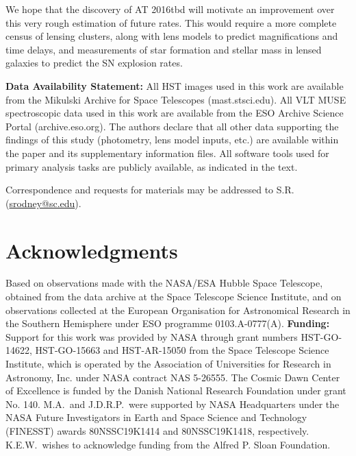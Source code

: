 \documentclass[12pt]{article}
\def\SNABC{AT 2016tbd\xspace}
\begin{document}
We hope that the discovery of \SNABC will motivate an improvement over this very rough estimation of future rates.   This would require a more complete census of lensing clusters, along with lens models to predict magnifications and time delays, and measurements of star formation and stellar mass in lensed galaxies to predict the SN explosion rates.   


\clearpage



%


{\bf Data Availability Statement:} All HST images used in this work are available from the Mikulski Archive for Space Telescopes (mast.stsci.edu). All VLT MUSE spectroscopic data used in this work are available from  the ESO Archive Science Portal (archive.eso.org). The authors declare that all other data supporting the findings of this study (photometry, lens model inputs, etc.) are available within the paper and its supplementary information files.  All software tools used for primary analysis tasks are publicly available, as indicated in the text.


Correspondence and requests for materials may be addressed to S.R. (\href{mailto:srodney@sc.edu}{srodney@sc.edu}).

\section*{Acknowledgments}

Based on observations made with the NASA/ESA Hubble Space Telescope, obtained from the data archive at the Space Telescope Science Institute, and on observations collected at the European Organisation for Astronomical Research in the Southern Hemisphere under ESO programme 0103.A-0777(A).  
{\bf Funding:} Support for this work was provided by NASA through grant numbers HST-GO-14622, HST-GO-15663 and HST-AR-15050 from the Space Telescope Science Institute, which is operated by the Association of Universities for Research in Astronomy, Inc. under NASA contract NAS 5-26555.  The Cosmic Dawn Center of Excellence is funded by the Danish National Research Foundation under grant No. 140. M.A.\ and J.D.R.P.\ were supported by NASA Headquarters under the NASA Future Investigators in Earth and Space Science and Technology (FINESST) awards 80NSSC19K1414 and 80NSSC19K1418, respectively.  K.E.W.\ wishes to acknowledge funding from the Alfred P. Sloan Foundation. 
\end{document}
